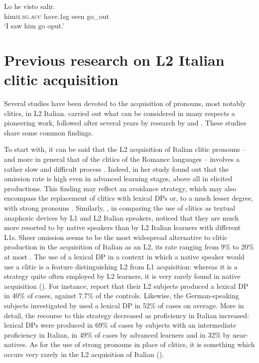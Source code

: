 \documentclass[output=paper,modfonts,nonflat,newtxmath]{langsci/langscibook}
\begin{document}
\ea \label{ex:sciutti:27}
    \gll Lo he visto salir.\\
         him\textsc{m.sg.acc} have.{1sg} seen go\_out \\
    \glt  ‘I saw him go oput.’
\z


\section{{Previous} {research} {on} {L2} {Italian} {clitic} acquisition} %
\label{sec:sciutti:3}

Several studies have been devoted to the acquisition of pronouns, most notably clitics, in L2 Italian. \citet{Berretta1986} carried out what can be considered in many respects a pioneering work, followed after several years by research by \citet{LeoniniBelletti2004, GianniniCancila2006, Santoro2007, Giannini2008} and \citet{Maffei2009}. These studies share some common findings.

To start with, it can be said that the L2 acquisition of Italian clitic pronouns – and more in general that of the clitics of the Romance languages – involves a rather slow and difficult process \citet{BruhnMontrul1996, White1996, DuffieldWhite1999, DuffieldEtAl2002, Santoro2007}. Indeed, in her study \citet{Giannini2008} found out that the omission rate is high even in advanced learning stages, above all in elicited productions. This finding may reflect an avoidance strategy, which may also encompass the replacement of clitics with lexical DPs or, to a much lesser degree, with strong pronouns \citet{LeoniniBelletti2004}. Similarly, \citet[191]{ChiniEtAl2003}, in comparing the use of clitics as textual anaphoric devices by L1 and L2 Italian speakers, noticed that they are much more resorted to by native speakers than by L2 Italian learners with different L1s. Sheer omission seems to be the most widespread alternative to clitic production in the acquisition of Italian as an L2, its rate ranging from 9\% to 20\% at most \citet{BellettiGuasti2015}. The use of a lexical DP in a context in which a native speaker would use a clitic is a feature distinguishing L2 from L1 acquisition: whereas it is a strategy quite often employed by L2 learners, it is very rarely found in native acquisition (\citealt{BellettiGuasti2015}). For instance, \citet{LeoniniBelletti2004} report that their L2 subjects produced a lexical DP in 40\% of cases, against 7.7\% of the controls. Likewise, the German-speaking subjects investigated by \citet{Leonini2006} used a lexical DP in 52\% of cases on average. More in detail, the recourse to this strategy decreased as proficiency in Italian increased: lexical DPs were produced in 69\% of cases by subjects with an intermediate proficiency in Italian, in 49\% of cases by advanced learners and in 32\% by near-natives. As for the use of strong pronouns in place of clitics, it is something which occurs very rarely in the L2 acquisition of Italian (\citealt{BellettiGuasti2015}).
\end{document}
